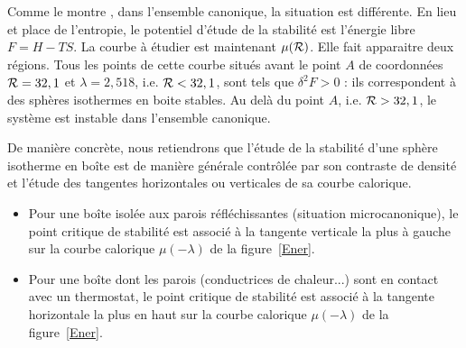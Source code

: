 	Comme le montre \cite{2002A&A...381..340C}, dans l'ensemble canonique, la situation est différente. En lieu et
	place de l'entropie, le potentiel d'étude de la stabilité est l'énergie libre $F=H-TS$. La courbe à étudier est
	maintenant $\mu(\mathcal{R})$. Elle fait apparaitre deux régions. Tous les points de cette courbe situés avant le point
	$A$ de coordonnées $\mathcal{R}=32,1$ et $\lambda=2,518$, i.e. $\mathcal{R}<32,1$, sont tels que $\delta^2 F>0$ : ils
	correspondent à des sphères isothermes en boite stables. Au delà du point $A$, i.e. $\mathcal{R}>32,1$, le système est
	instable dans l'ensemble canonique.
	
	De manière concrète, nous retiendrons que l'étude de la stabilité d'une sphère isotherme en boîte est de manière générale contrôlée par son
	contraste de densité et l'étude des tangentes horizontales ou verticales de sa courbe calorique.   
	\begin{itemize}

		\item Pour une boîte isolée aux parois réfléchissantes (situation microcanonique), le point critique de
			stabilité est associé à la tangente verticale la plus à gauche sur la courbe calorique
			$\mu(-\lambda)$ de la figure~\ref{Ener}.

		\item Pour une boîte dont les parois (conductrices de chaleur...) sont en contact avec un thermostat, le
			point critique de stabilité est associé à la tangente horizontale la plus en haut sur la courbe
			calorique $\mu(-\lambda)$ de la figure~\ref{Ener}.

	\end{itemize}
	
